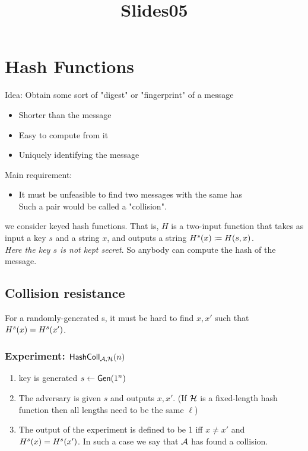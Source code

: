 \documentclass[12pt]{article}
\title{Slides05}
\begin{document}
\maketitle
\tableofcontents
\newpage

\section{Hash Functions}
Idea: Obtain some sort of "digest" or "fingerprint" of a message
\begin{itemize}
\item Shorter than the message
\item Easy to compute from it
\item Uniquely identifying the message
\end{itemize}

Main requirement:
\begin{itemize}
\item It must be unfeasible to find two messages with the same has\\
Such a pair would be called a "collision".

\end{itemize}
we consider keyed hash functions. That is, $H$ is a two-input function that takes as input a key $s$ and a string $x$, and outputs a string $H^s(x)\coloneqq H(s,x)$. \\
\emph{Here the key $s$ is not kept secret}. So anybody can compute the hash of the message.

\subsection{Collision resistance}
For a randomly-generated s, it must be hard to find $x,x'$ such that $H^s(x)=H^s(x')$.
\subsubsection{Experiment: $\mathsf{HashColl}_{\mathcal{A},\mathcal{H}}(n)$}
\begin{enumerate}
\item key is generated $s\leftarrow \operatorname{\mathsf{Gen}}(1^n)$
\item The adversary is given $s$ and outputs $x,x'$. (If $\mathcal{H}$ is a fixed-length hash function then all lengths need to be the same $\ell$)
\item The output of the experiment is defined to be 1 iff $x\neq x'$ and $H^s(x)=H^s(x')$. In such a case we say that $\mathcal{A}$ has found a collision.
\end{enumerate}
\end{document}
